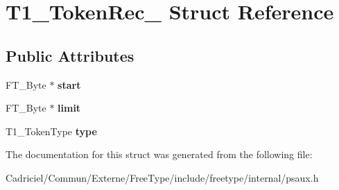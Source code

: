 \hypertarget{struct_t1___token_rec__}{\section{T1\-\_\-\-Token\-Rec\-\_\- Struct Reference}
\label{struct_t1___token_rec__}
}
\subsection*{Public Attributes}
\begin{DoxyCompactItemize}
\item 
\hypertarget{struct_t1___token_rec___a1b365e2910220eabf05f925f45bc98d6}{F\-T\-\_\-\-Byte $\ast$ {\bfseries start}}\label{struct_t1___token_rec___a1b365e2910220eabf05f925f45bc98d6}

\item 
\hypertarget{struct_t1___token_rec___aacd035f0dfbc47b7e1c7eefbe2c2080c}{F\-T\-\_\-\-Byte $\ast$ {\bfseries limit}}\label{struct_t1___token_rec___aacd035f0dfbc47b7e1c7eefbe2c2080c}

\item 
\hypertarget{struct_t1___token_rec___a88b3b889e74609be1827ead4093a2d52}{T1\-\_\-\-Token\-Type {\bfseries type}}\label{struct_t1___token_rec___a88b3b889e74609be1827ead4093a2d52}

\end{DoxyCompactItemize}


The documentation for this struct was generated from the following file\-:\begin{DoxyCompactItemize}
\item 
Cadriciel/\-Commun/\-Externe/\-Free\-Type/include/freetype/internal/psaux.\-h\end{DoxyCompactItemize}
